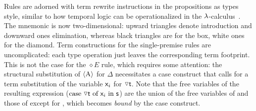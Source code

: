 Rules are adorned with term rewrite instructions in the propositions as types style, similar to how temporal logic can be operationalized in the $\mathnormal{\lambda}$-calculus~\cite{wansing2002sequent}.
The mnemonic is now two-dimensional: upward triangles denote introduction and downward ones elimination, whereas black triangles are for the box, white ones for the diamond.
Term constructions for the single-premise rules are uncomplicated: each type operation just leaves the corresponding term footprint.
This is not the case for the $\diamond E$ rule, which requires some attention:
the structural substitution of $\langle{ \ensuremath{\normalfont\textsc{A}}}\rangle$ for $\Delta$ necessitates a case construct that calls for a term substitution of the variable $\mathsf{\mathsf{x}_{\mathnormal{i}} }$ for $\diaelim\smallterm{t}$.
Note that the free variables of the resulting expression ($\caseof{\diaelim t}{\vari }{s}$) are the union of the free variables of  and those of  except for \smallterm{\vari }, which becomes \textit{bound} by the case construct.


